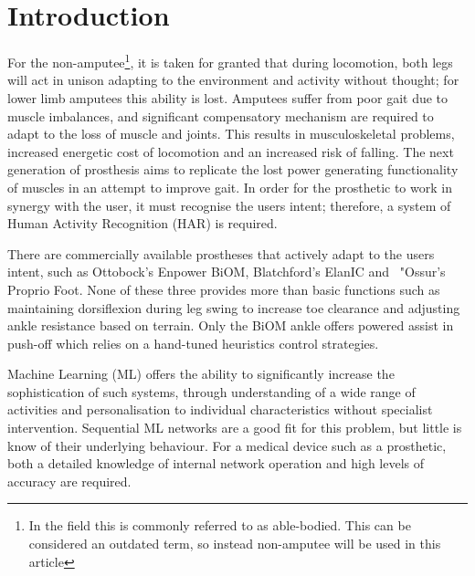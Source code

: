 \documentclass[sensors,article,submit,moreauthors,pdftex]{Definitions/mdpi}
\begin{document}


\section{Introduction}
For the non-amputee\footnote{In the field this is commonly referred to as able-bodied. This can be considered an outdated term, so instead non-amputee will be used in this article}, it is taken for granted that during locomotion, both legs will act in unison adapting to the environment and activity without thought; for lower limb amputees this ability is lost. Amputees suffer from poor gait due to muscle imbalances, and significant compensatory mechanism are required to adapt to the loss of muscle and joints\cite{Silverman2008}. This results in musculoskeletal problems, increased energetic cost of locomotion and an increased risk of falling\cite{Herr2012, Piazza2017, McDonald2018}. The next generation of prosthesis aims to replicate the lost power generating functionality of muscles in an attempt to improve gait. In order for the prosthetic to work in synergy with the user, it must recognise the users intent; therefore, a system of Human Activity Recognition (HAR) is required.

There are commercially available prostheses that actively adapt to the users intent, such as Ottobock's Enpower BiOM\cite{Enpower}, Blatchford's ElanIC\cite{ElanIC} and \ "Ossur's Proprio Foot\cite{Proprio}. None of these three provides more than basic functions such as maintaining dorsiflexion during leg swing to increase toe clearance and adjusting ankle resistance based on terrain. Only the BiOM ankle offers powered assist in push-off which relies on a hand-tuned heuristics control strategies\cite{Montgomery2018}.

Machine Learning (ML) offers the ability to significantly increase the sophistication of such systems, through understanding of a wide range of activities and personalisation to individual characteristics without specialist intervention\cite{Labarriere2020}. Sequential ML networks are a good fit for this problem, but little is know of their underlying behaviour. For a medical device such as a prosthetic, both a detailed knowledge of internal network operation and high levels of accuracy are required. 
\end{document}
